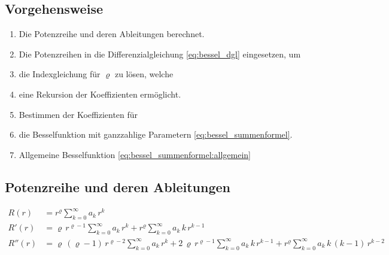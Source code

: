 \begin{refsection}
\subsection*{Vorgehensweise}
\begin{enumerate}
	\item Die Potenzreihe und deren Ableitungen berechnet.
	\item Die Potenzreihen in die Differenzialgleichung \ref{eq:bessel_dgl} eingesetzen, um
	\item die Indexgleichung f\"ur $\varrho$ zu l\"osen, welche
	\item eine Rekursion der Koeffizienten erm\"oglicht.
	\item Bestimmen der Koeffizienten f\"ur
	\item die Besselfunktion mit ganzzahlige Parametern \ref{eq:bessel_summenformel}.
	\item Allgemeine Besselfunktion \ref{eq:bessel_summenformel:allgemein}
\end{enumerate}


\subsection*{Potenzreihe und deren Ableitungen}
\begin{align*}
	R \left( r \right)
	&=
	r^{\varrho}
	\sum_{k=0}^{\infty} a_k \, r^k
\\
	R'\left( r \right)
	&=
	\varrho \, r^{\varrho - 1}
	\sum_{k=0}^{\infty} a_k \, r^k
	+
	r^{\varrho}
	\sum_{k=0}^{\infty} a_k \, k \, r^{k - 1}
\\
	R'' \left( r \right)
	&=
	\varrho \, \left( \varrho - 1 \right) \, r^{\varrho - 2}
	\sum_{k=0}^{\infty} a_k \, r^k
	+
	2 \, \varrho \, r^{\varrho - 1}
	\sum_{k=0}^{\infty} a_k \, k \, r^{k - 1}
	+
	r^{\varrho}
	\sum_{k=0}^{\infty} a_k \, k \, \left( k - 1 \right) \, r^{k - 2}	
\end{align*}

\end{refsection}
